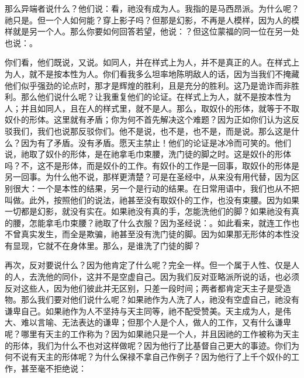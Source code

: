 那么异端者说什么？他们说：看，祂没有成为人。我指的是马西昂派。为什么呢？祂只是。但一个人如何能？穿上影子吗？但那是幻影，不再是人模样，因为人的模样就是另一个人。那么你要如何回答若望，他说：？但这位蒙福的同一位在另一处也说：。\par

你们看，他们既说，又说。如同人，并在样式上为人，并不是真正的人。在样式上为人，就不是按本性为人。你们看我多么坦率地陈明敌人的话，因为当我们不掩藏他们似乎强劲的论点时，那才是辉煌的胜利，且是充分的胜利。这乃是诡诈而非胜利。那么他们说什么呢？让我重复他们的论证。在样式上为人，就不是按本性为人；并且如同人，且在人的样式里，就不是人。那么，取奴仆的形体，就等于不取奴仆的形体。这里就有矛盾；你为何不首先解决这个难题？因为正如你们认为这反驳我们，我们也说那反驳你们。他不是说，也不是，也不是，而是说。那么这是什么？因为有了矛盾。没有矛盾。愿天主禁止！他们的论证是冰冷而可笑的。他们说，祂取了奴仆的形体，是在祂拿毛巾束腰，洗门徒的脚之时。这是奴仆的形体吗？不，这不是形体，而是奴仆的工作。有奴仆的工作是一回事，取奴仆的形体是另一回事。为什么他不说，那样更清楚？可是在圣经中，从来没有用代替，因为区别很大：一个是本性的结果，另一个是行动的结果。在日常用语中，我们也从不把叫做。此外，按照他们的说法，祂甚至没有取奴仆的工作，也没有束腰。因为如果一切都是幻影，就没有实在。如果祂没有真的手，怎能洗他们的脚？如果祂没有真的腰，怎能拿毛巾束腰？祂取了什么衣服？因为圣经说：。如此看来，就连工作也不曾真实发生，而全是欺骗，祂甚至没有洗门徒的脚。因为如果那无形体的本性没有显现，它就不在身体里。那么，是谁洗了门徒的脚？\par

再次，反对要说什么？因为他肯定了什么呢？完全一样。但一个属于人性、仅是人的人，去洗他的同仆，这并不是空虚自己。因为我们反对亚略派所说的话，也必须反对这些人，因为他们彼此并无区别，只差一段时间；两者都肯定天主子是受造物。那么我们要对他们说什么呢？如果祂作为人洗了人，祂没有空虚自己，祂没有谦卑自己。如果祂作为人不坚持与天主同等，祂不配受赞美。天主成为人，是伟大、难以言喻、无法表达的谦卑；但那个人是个人，做人的工作，又有什么谦卑呢？哪里有天主的工作称为？因为如果祂只是一个人，并且因祂的工作被称为天主的形体，我们为什么不也对这样做呢？因为他行了比基督自己更大的事迹。你们为何不说有天主的形体呢？为什么保禄不拿自己作例子？因为他行了上千个奴仆的工作，甚至毫不拒绝说：\par

